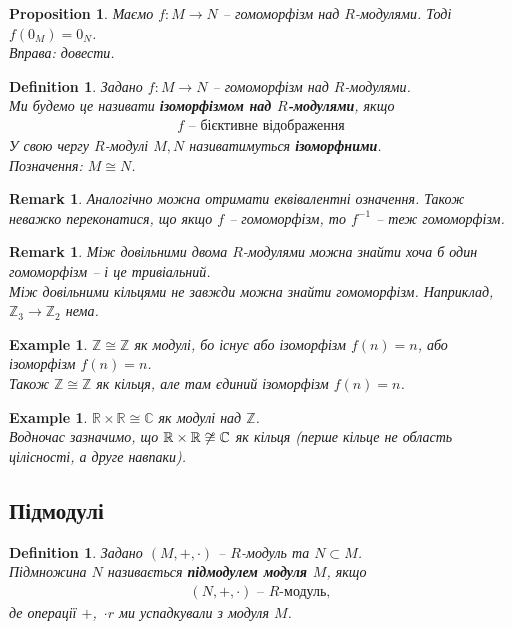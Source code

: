 \documentclass[a4paper, 10pt]{article}
\theoremstyle{theoremdd}
\theoremstyle{theoremdd}
\newtheorem{definition}[theorem]{Definition}
\theoremstyle{theoremdd}
\theoremstyle{theoremdd}
\theoremstyle{theoremdd}
\newtheorem{example}[theorem]{Example}
\theoremstyle{theoremdd}
\theoremstyle{theoremdd}
\theoremstyle{theoremdd}
\theoremstyle{theoremdd}
\newtheorem{proposition}[theorem]{Proposition}
\theoremstyle{theoremdd}
\theoremstyle{theoremdd}
\newtheorem{remark}[theorem]{Remark}
\theoremstyle{theoremdd}
\theoremstyle{theoremdd}
\theoremstyle{theoremdd}
\theoremstyle{theoremdd}
\begin{document}
\begin{proposition}
Маємо $f \colon M \to N$ -- гомоморфізм над $R$-модулями. Тоді $f(0_M) = 0_N$.\\
\textit{Вправа: довести.}
\end{proposition}

\begin{definition}
Задано $f \colon M \to N$ -- гомоморфізм над $R$-модулями.\\
Ми будемо це називати \textbf{ізоморфізмом над $R$-модулями}, якщо
\begin{align*}
f \text{ -- бієктивне відображення}
\end{align*}
У свою чергу $R$-модулі $M,N$ називатимуться \textbf{ізоморфними}.\\
Позначення: $M \cong N$.
\end{definition}

\begin{remark}
Аналогічно можна отримати еквівалентні означення. Також неважко переконатися, що якщо $f$ -- гомоморфізм, то $f^{-1}$ -- теж гомоморфізм.
\end{remark}

\begin{remark}
Між довільними двома $R$-модулями можна знайти хоча б один гомоморфізм -- і це тривіальний.\\
Між довільними кільцями не завжди можна знайти гомоморфізм. Наприклад, $\mathbb{Z}_3 \to \mathbb{Z}_2$ нема.
\end{remark}

\begin{example}
$\mathbb{Z} \cong \mathbb{Z}$ як модулі, бо існує або ізоморфізм $f(n) = n$, або ізоморфізм $f(n) = n$. \\
Також $\mathbb{Z} \cong \mathbb{Z}$ як кільця, але там єдиний ізоморфізм $f(n) = n$.
\end{example}

\begin{example}
$\mathbb{R} \times \mathbb{R} \cong \mathbb{C}$ як модулі над $\mathbb{Z}$.\\
Водночас зазначимо, що $\mathbb{R} \times \mathbb{R} \centernot\cong \mathbb{C}$ як кільця (перше кільце не область цілісності, а друге навпаки).
\end{example}

\subsection{Підмодулі}
\begin{definition}
Задано $(M,+,\cdot)$ -- $R$-модуль та $N \subset M$.\\
Підмножина $N$ називається \textbf{підмодулем модуля $M$}, якщо 
\begin{align*}
(N,+,\cdot) \text{ -- $R$-модуль},
\end{align*}
де операції $+$,\ $\cdot r$ ми успадкували з модуля $M$.
\end{definition}
\end{document}
